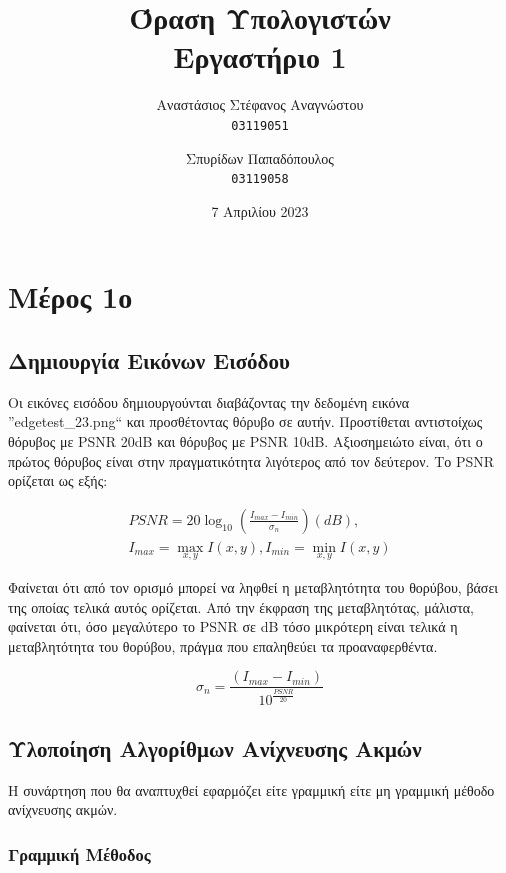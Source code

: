 \documentclass{article}
\title{Όραση Υπολογιστών\\
        \large Εργαστήριο 1}
\author{Αναστάσιος Στέφανος Αναγνώστου\\
    \texttt{03119051}
        \and
        Σπυρίδων Παπαδόπουλος\\
    \texttt{03119058}}
\date{7 Απριλίου 2023}
\newcommand{\eng}[1]{\foreignlanguage{english}{#1}}
\begin{document}
\maketitle

\newpage
\tableofcontents
\newpage

\section{Μέρος 1ο}

\subsection{Δημιουργία Εικόνων Εισόδου}

Οι εικόνες εισόδου δημιουργούνται διαβάζοντας την δεδομένη εικόνα ''\eng{edgetest\_23.png}`` και προσθέτοντας θόρυβο σε αυτήν. Προστίθεται αντιστοίχως θόρυβος με \eng{PSNR} 20\eng{dB} και θόρυβος με \eng{PSNR} 10\eng{dB}. Αξιοσημειώτο είναι, ότι ο πρώτος θόρυβος είναι στην πραγματικότητα λιγότερος από τον δεύτερον. Το \eng{PSNR} ορίζεται ως εξής:

\begin{equation}
    \begin{gathered}
        PSNR = 20\log_{10} \left(\frac{I_{max}-I_{min}}{\sigma_n} \right)(dB),\\
        I_{max} = \underset{x,y} {\max} I(x,y), I_{min} = \underset{x,y} {\min} I(x,y)
    \end{gathered}
\end{equation}

Φαίνεται ότι από τον ορισμό μπορεί να ληφθεί η μεταβλητότητα του θορύβου, βάσει της οποίας τελικά αυτός ορίζεται. Από την έκφραση της μεταβλητότας, μάλιστα, φαίνεται ότι, όσο μεγαλύτερο το \eng{PSNR} σε \eng{dB} τόσο μικρότερη είναι τελικά η μεταβλητότητα του θορύβου, πράγμα που επαληθεύει τα προαναφερθέντα.

\begin{equation}
    \sigma_n = \frac{\left(I_{max}-I_{min}\right)}{10^{\frac{PSNR}{20}}}
\end{equation}

\subsection{Υλοποίηση Αλγορίθμων Ανίχνευσης Ακμών}

Η συνάρτηση που θα αναπτυχθεί εφαρμόζει είτε γραμμική είτε μη γραμμική μέθοδο ανίχνευσης ακμών.

\subsubsection{Γραμμική Μέθοδος}
\end{document}
